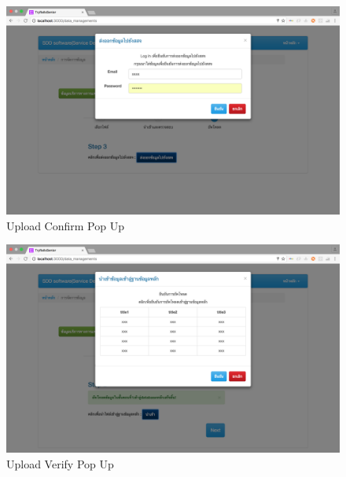             \FloatBarrier
                \begin{figure}[h!]
                    \centering
                        \includegraphics[width=12cm]{images/chapter-01/mockup_rails/upload_confirm.png}
                    	\caption{Upload Confirm Pop Up}
                    	\label{upload_confirm}
                \end{figure}
            \FloatBarrier
            
            \FloatBarrier
                \begin{figure}[h!]
                    \centering
                        \includegraphics[width=12cm]{images/chapter-01/mockup_rails/upload_verify.png}
                    	\caption{Upload Verify Pop Up}
                    	\label{upload_verify}
                \end{figure}
            \FloatBarrier
            
